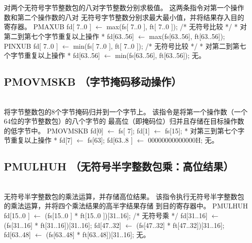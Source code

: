 \begin{instructionblk}
   \\
   \\
  {对两个无符号字节整数包的八对字节整数分别求极值。}
  {这两条指令对第一个操作数和第二个操作数的八对
  无符号字节整数分别求最大最小值，并将结果存入目的寄存器。}
  {PMAXUB \narrownewline
  fd[ 7..0 ] $\leftarrow$ max(fs[ 7..0 ], ft[ 7..0 ]); /* 无符号比较 */ \narrownewline
  * 对第二到第七个字节重复以上操作 * \narrownewline
  fd[63..56] $\leftarrow$ max(fs[63..56], ft[63..56]); \narrownewline \narrownewline
  PINXUB \narrownewline
  fd[ 7..0 ] $\leftarrow$ min(fs[ 7..0 ], ft[ 7..0 ]); /* 无符号比较 */ \narrownewline
  * 对第二到第七个字节重复以上操作 * \narrownewline
  fd[63..56] $\leftarrow$ min(fs[63..56], ft[63..56]);}
  {无。}
\end{instructionblk}

\subsection{PMOVMSKB （字节掩码移动操作）}

\begin{instructionblk}
   \\
  {将字节整数包的8个字节掩码归并到一个字节上。}
  {该指令是将第一个操作数（一个64位的字节整数包）的八个字节的
  最高位（即掩码位）归并且存储在目标操作数的低字节中。}
  {PMOVMSKB \narrownewline
  fd[0] $\leftarrow$ fs[ 7]; \narrownewline
  fd[1] $\leftarrow$ fs[15]; \narrownewline
  * 对第三到第七个字节重复以上操作 * \narrownewline
  fd[7] $\leftarrow$ fs[63]; \narrownewline
  fd[63..8 ] $\leftarrow$ 00000000000000H;}
  {无。}
\end{instructionblk}

\subsection{PMULHUH （无符号半字整数包乘：高位结果）}

\begin{instructionblk}
   \\
  {无符号半字整数包的乘法运算，并存储高位结果。}
  {该指令执行无符号半字整数包的乘法运算，并将四个乘法结果的高半字结果存储
  到目的寄存器中。}
  {PMULHUH \narrownewline
  fd[15..0 ] $\leftarrow$ (fs[15..0 ] * ft[15..0 ])[31..16]; /* 无符号乘 */ \narrownewline
  fd[31..16] $\leftarrow$ (fs[31..16] * ft[31..16])[31..16]; \narrownewline
  fd[47..32] $\leftarrow$ (fs[47..32] * ft[47..32])[31..16]; \narrownewline
  fd[63..48] $\leftarrow$ (fs[63..48] * ft[63..48])[31..16];}
  {无。}
\end{instructionblk}


